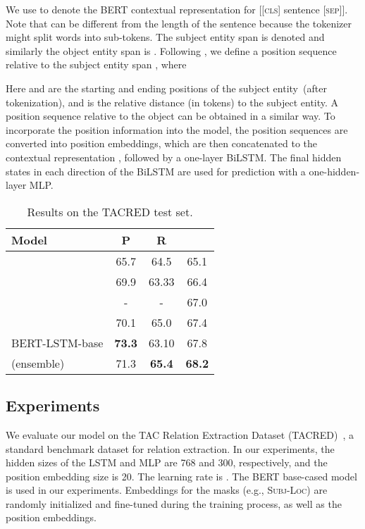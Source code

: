 \documentclass[11pt,a4paper]{article}
\begin{document}
We use  to denote the BERT contextual representation for [[\textsc{cls}] sentence [\textsc{sep}]]. 
Note that  can be different from the length of the sentence because the tokenizer might split words into sub-tokens. 
The subject entity span is denoted  and similarly the object entity span is . 
Following \citet{zhang2017position}, we define a position sequence relative to the subject entity span , where

Here  and  are the starting and ending positions of the subject entity~(after tokenization), 
and  is the relative distance (in tokens) to the subject entity. 
A position sequence relative to the object  can be obtained in a similar way. 
To incorporate the position information into the model, the position sequences are converted into position embeddings, 
which are then concatenated to the contextual representation , followed by a one-layer BiLSTM. 
The final hidden states in each direction of the BiLSTM are used for prediction with a one-hidden-layer MLP. 


\begin{table}[t]
	\centering
	\small
	\begin{tabular}{l@{\qquad}ccc}
		\toprule
		\textbf{Model}         & \textbf{P} & \textbf{R} &  \\ \midrule
		\citet{zhang2017position} &  65.7 & 64.5 & 65.1 \\ 
		\citet{zhang2018graph} & 69.9  & 63.33   &  66.4 \\
		\citet{wu2019simplifying} &  - & - & 67.0 \\ 
		\citet{alt2018improving} & 70.1 & 65.0 & 67.4 \\ \midrule
		BERT-LSTM-base & \textbf{73.3} & 63.10 & 67.8 \\  \midrule
		\citet{zhang2018graph} (ensemble) & 71.3 & \textbf{65.4} & \textbf{68.2} \\
		\bottomrule
	\end{tabular}
	\caption{Results on the \textsc{TACRED} test set.}
	\label{res:rel_tacred}
\end{table}

\subsection{Experiments}

We evaluate our model on the TAC Relation Extraction Dataset (TACRED)~\cite{zhang2017position}, a standard benchmark dataset for relation extraction.
In our experiments, the hidden sizes of the LSTM and MLP are 768 and 300, respectively, and the position embedding size is 20. The learning rate is .  
The BERT base-cased model is used in our experiments. 
Embeddings for the masks (e.g., \textsc{Subj-Loc}) are randomly initialized and fine-tuned during the training process, as well as the position embeddings. 
\end{document}
